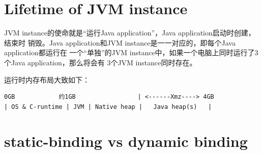 \documentclass[a4paper,11pt]{article}
\begin{document}
\section[Lifetime of JVM instance]{Lifetime of JVM instance}
JVM instance的使命就是“运行Java application”，Java application启动时创建，结束时
销毁。Java application和JVM instance是一一对应的，即每个Java application都运行在
一个“单独”的JVM instance中，如果一个电脑上同时运行了3个Java application，那么将会有
3个JVM instance同时存在。

运行时内存布局大致如下：
\begin{verbatim}
0GB            约1GB                 | <------Xmz----> 4GB
| OS & C-runtime | JVM | Native heap |   Java heap(s)   |
\end{verbatim}





\section[static-binding vs dynamic binding]{static-binding vs dynamic binding}
\label{sec:dynamicbinding}


\end{document}
